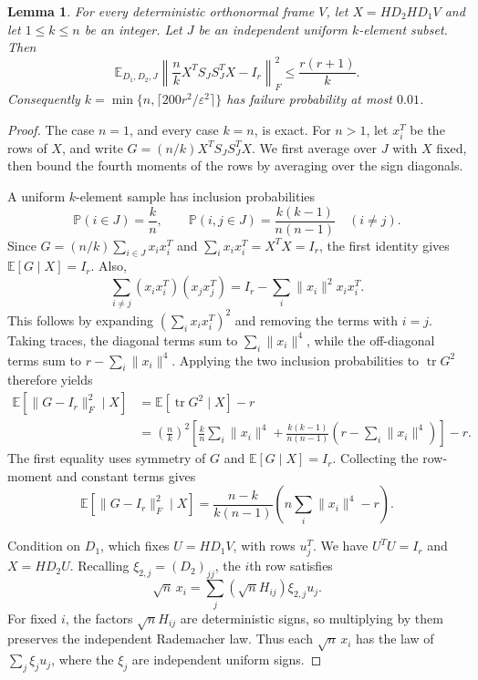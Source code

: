 \documentclass[11pt]{article}
\newtheorem{lemma}[theorem]{Lemma}
\theoremstyle{definition}
\theoremstyle{remark}
\theoremstyle{plain}
\newcommand{\E}{\mathbb E}
\newcommand{\Prob}{\mathbb P}
\DeclareMathOperator{\tr}{tr}
\begin{document}
\begin{lemma}\label{lem:small}
For every deterministic orthonormal frame \(V\), let \(X=HD_2HD_1V\)
and let $1\le k\le n$ be an integer. Let \(J\) be an independent
uniform \(k\)-element subset. Then
\begin{equation}\label{eq:small-rank-moment}
 \E_{D_1,D_2,J}\left\|\frac nkX^TS_JS_J^TX-I_r\right\|_F^2
                                      \le\frac{r(r+1)}k.
\end{equation}
Consequently \(k=\min\{n,\lceil200r^2/\varepsilon^2\rceil\}\)
has failure probability at most \(0.01\).
\end{lemma}
\begin{proof}
The case \(n=1\), and every case \(k=n\), is exact.
For \(n>1\), let \(x_i^T\) be the rows of \(X\), and write
\(G=(n/k)X^TS_JS_J^TX\). We first average over $J$ with $X$
fixed, then bound the fourth moments of the rows by averaging over
the sign diagonals.

A uniform $k$-element sample has inclusion probabilities
\[
 \Prob(i\in J)=\frac kn,\qquad
 \Prob(i,j\in J)=\frac{k(k-1)}{n(n-1)}\quad(i\ne j).
\]
Since $G=(n/k)\sum_{i\in J}x_ix_i^T$ and
$\sum_i x_ix_i^T=X^TX=I_r$, the first identity gives
$\E[G\mid X]=I_r$. Also,
\[
 \sum_{i\ne j}(x_ix_i^T)(x_jx_j^T)
       =I_r-\sum_i\|x_i\|^2x_ix_i^T.
\]
This follows by expanding $(\sum_i x_ix_i^T)^2$ and removing the
terms with $i=j$. Taking traces, the diagonal terms sum to
$\sum_i\|x_i\|^4$, while the off-diagonal terms sum to
$r-\sum_i\|x_i\|^4$. Applying the two inclusion probabilities to
$\tr G^2$ therefore yields
\[
 \begin{aligned}
 \E[\|G-I_r\|_F^2\mid X]
   &=\E[\tr G^2\mid X]-r\\
   &=\left(\frac nk\right)^2
     \left[\frac kn\sum_i\|x_i\|^4
       +\frac{k(k-1)}{n(n-1)}
          \left(r-\sum_i\|x_i\|^4\right)\right]-r.
 \end{aligned}
\]
The first equality uses symmetry of $G$ and $\E[G\mid X]=I_r$.
Collecting the row-moment and constant terms gives
\begin{equation}\label{eq:conditional-sampling-moment}
 \E\!\left[\|G-I_r\|_F^2\mid X\right]
  =\frac{n-k}{k(n-1)}
                \left(n\sum_i\|x_i\|^4-r\right).
\end{equation}

Condition on $D_1$, which fixes $U=HD_1V$, with rows $u_j^T$.
We have $U^TU=I_r$ and $X=HD_2U$. Recalling
$\xi_{2,j}=(D_2)_{jj}$, the $i$th row satisfies
\[
 \sqrt n\,x_i=\sum_j(\sqrt n H_{ij})\xi_{2,j}u_j.
\]
For fixed $i$, the factors $\sqrt n H_{ij}$ are deterministic
signs, so multiplying by them preserves the independent Rademacher
law. Thus each $\sqrt n\,x_i$ has the law of $\sum_j\xi_j u_j$,
where the $\xi_j$ are independent uniform signs.


\end{proof}
\end{document}

